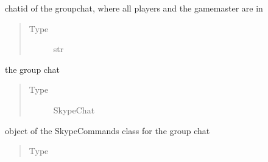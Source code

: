 \documentclass[letterpaper,10pt,english]{sphinxmanual}
\begin{document}
\begin{fulllineitems}
\begin{fulllineitems}
\end{fulllineitems}


\begin{fulllineitems}
\label{\detokenize{chatwolf:chatwolf.game.Game.chatid}}
chatid of the group\sphinxhyphen{}chat, where all players and the game\sphinxhyphen{}master are in
\begin{quote}\begin{description}
\item[{Type}] \leavevmode
str

\end{description}\end{quote}

\end{fulllineitems}


\begin{fulllineitems}
\label{\detokenize{chatwolf:chatwolf.game.Game.chat}}
the group chat
\begin{quote}\begin{description}
\item[{Type}] \leavevmode
SkypeChat

\end{description}\end{quote}

\end{fulllineitems}


\begin{fulllineitems}
\label{\detokenize{chatwolf:chatwolf.game.Game.skc}}
object of the SkypeCommands class for the group chat
\begin{quote}\begin{description}
\item[{Type}] \leavevmode
{\hyperref[\detokenize{chatwolf:chatwolf.skypecommands.SkypeCommands}]{}}

\end{description}\end{quote}


\end{fulllineitems}
\end{fulllineitems}
\end{document}

